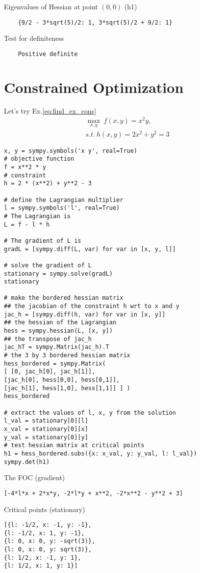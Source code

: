 \documentclass[10pt,a4paper]{book}
\theoremstyle{definition}\newtheorem{definition}{Definition}
\theoremstyle{definition}\newtheorem{fact}{Fact}
\theoremstyle{definition}\newtheorem{ex}{Ex.}
\theoremstyle{definition}\newtheorem{project}{Project}
\theoremstyle{definition}\newtheorem{problem}{Problem}
\theoremstyle{definition}\newtheorem{example}{Example}
\numberwithin{theorem}{chapter}
\numberwithin{corollary}{chapter}
\numberwithin{assumption}{chapter}
\numberwithin{definition}{chapter}
\numberwithin{prop}{chapter}
\numberwithin{notation}{chapter}
\numberwithin{problem}{chapter}
\numberwithin{example}{chapter}
\numberwithin{fact}{chapter}
\numberwithin{ex}{chapter}
\begin{document}
Eigenvalues of Hessian at point $(0,0)$ (h1)
\begin{verbatim}
	{9/2 - 3*sqrt(5)/2: 1, 3*sqrt(5)/2 + 9/2: 1}
\end{verbatim}
	
Test for definiteness
\begin{verbatim}
	Positive definite
\end{verbatim}	


	\section{Constrained Optimization}
	Let's try Ex.\ref{eq:find_ex_cons}
	\begin{align*}
		\max_{x,y}  \ f(x,y) = x^2 y, \\
		s.t. \ h(x,y) = 2x^2 + y^2 = 3
	\end{align*}
	\begin{framed}
	\begin{verbatim}
x, y = sympy.symbols('x y', real=True)
# objective function
f = x**2 * y 
# constraint
h = 2 * (x**2) + y**2 - 3

# define the Lagrangian multiplier
l = sympy.symbols('l', real=True)
# The Lagrangian is 
L = f - l * h

# The gradient of L is 
gradL = [sympy.diff(L, var) for var in [x, y, l]]

# solve the gradient of L 
stationary = sympy.solve(gradL)
stationary

# make the bordered hessian matrix
## the jacobian of the constraint h wrt to x and y
jac_h = [sympy.diff(h, var) for var in [x, y]]
## the hessian of the Lagrangian
hess = sympy.hessian(L, [x, y])
## the transpose of jac_h
jac_hT = sympy.Matrix(jac_h).T
# the 3 by 3 bordered hessian matrix 
hess_bordered = sympy.Matrix(
[ [0, jac_h[0], jac_h[1]],
[jac_h[0], hess[0,0], hess[0,1]],
[jac_h[1], hess[1,0], hess[1,1]] ] )
hess_bordered

# extract the values of l, x, y from the solution
l_val = stationary[0][l]
x_val = stationary[0][x]
y_val = stationary[0][y]
# test hessian matrix at critical points
h1 = hess_bordered.subs({x: x_val, y: y_val, l: l_val})
sympy.det(h1)
	\end{verbatim}
	\end{framed}

The FOC (gradient)
\begin{verbatim}
[-4*l*x + 2*x*y, -2*l*y + x**2, -2*x**2 - y**2 + 3]
\end{verbatim}
Critical points (stationary)
\begin{verbatim}
[{l: -1/2, x: -1, y: -1},
{l: -1/2, x: 1, y: -1},
{l: 0, x: 0, y: -sqrt(3)},
{l: 0, x: 0, y: sqrt(3)},
{l: 1/2, x: -1, y: 1},
{l: 1/2, x: 1, y: 1}]
\end{verbatim}
\end{document}
